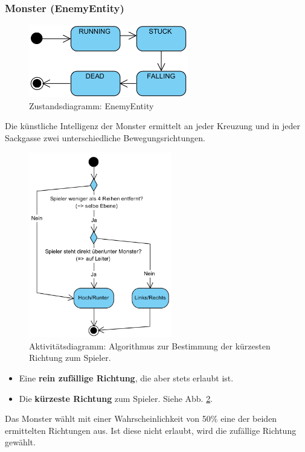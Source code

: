 \documentclass[12pt]{article}
\begin{document}
\subsubsection{Monster (EnemyEntity)}
	\begin{figure}[ht]
		\centering
		\includegraphics[height=90pt]{images/sd_enemy}
		\caption{Zustandsdiagramm: EnemyEntity}
		\label{fig:impl:enemy_entity}
	\end{figure}
	Die künstliche Intelligenz der Monster ermittelt an jeder Kreuzung und in jeder Sackgasse zwei unterschiedliche Bewegungsrichtungen.
	\begin{figure}[ht]
		\centering
		\includegraphics[height=230pt]{images/ad_monster}
		\caption{Aktivitätsdiagramm: Algorithmus zur Bestimmung der kürzesten Richtung zum Spieler.}
		\label{fig:impl:ki_enemy_entity}
	\end{figure}

	\begin{itemize}
	\item Eine \textbf{rein zufällige Richtung}, die aber stets erlaubt ist.
	\item Die \textbf{kürzeste Richtung} zum Spieler. Siehe Abb. \ref{fig:impl:ki_enemy_entity}.
	\end{itemize}

	Das Monster wählt mit einer Wahrscheinlichkeit von 50\% eine der beiden ermittelten Richtungen aus. Ist diese nicht erlaubt, wird die zufällige Richtung gewählt.
	
\end{document}
